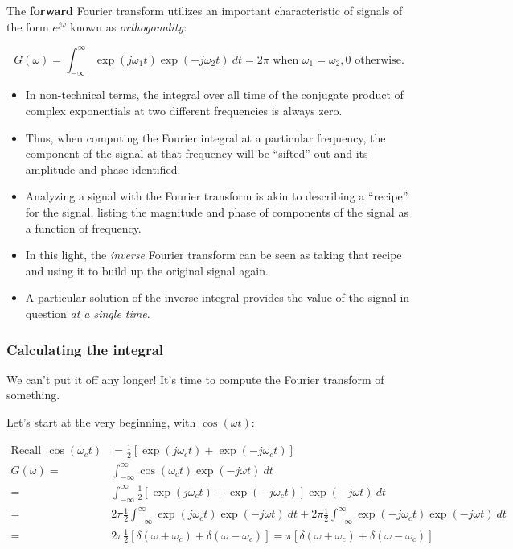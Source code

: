 \documentclass[11pt,letterpaper,draft]{exam}
\begin{document}
The \textbf{forward} Fourier transform utilizes an important
characteristic of signals of the form $e^{j\omega}$ known as \textit{orthogonality}:

\begin{equation*}
G(\omega)= \int^{\infty}_{-\infty}\exp(j\omega_1
t)\exp(-j\omega_2 t)~dt = 2\pi \text{ when }\omega_1=\omega_2, 0
\text{ otherwise}.
\end{equation*}

\begin{itemize}
\item In non-technical terms, the integral over all time of the
conjugate product of complex exponentials at two
different frequencies is always zero.

\item Thus, when computing the Fourier integral at a particular frequency,
the component of the signal at that frequency will be ``sifted'' out
and its amplitude and phase identified.

\item Analyzing a signal with the Fourier transform is akin to describing a
``recipe'' for the signal, listing the magnitude and phase of components of the signal as a
function of frequency.

\item In this light, the \textit{inverse} Fourier transform can be seen as taking
that recipe and using it to build up the original signal again. 

\item A particular solution of the inverse integral provides the value of
the signal in question \textit{at a single time}.

\end{itemize}

\subsubsection*{Calculating the integral}
We can't put it off any longer!  It's time to compute the Fourier
transform of something.  

Let's start at the very beginning, with $\cos(\omega t)$:

\begin{equation}
\begin{split}
\text{Recall}~~\cos(\omega_c t) &= \frac{1}{2}[\exp(j\omega_c t)+\exp(-j\omega_c t)]\\
G(\omega) =& \int^{\infty}_{-\infty}\cos(\omega_c t)\exp(-j\omega t)~dt\\
=& \int^{\infty}_{-\infty}\frac{1}{2}[\exp(j\omega_c t)+\exp(-j\omega_c
t)]\exp(-j\omega t)~dt\\
=& 2\pi\frac{1}{2}\int^{\infty}_{-\infty}\exp(j\omega_c t)\exp(-j\omega
t)~dt + 2\pi\frac{1}{2}\int^{\infty}_{-\infty}\exp(-j\omega_c t)\exp(-j\omega
t)~dt\\
=& 2\pi\frac{1}{2}[\delta(\omega+\omega_c)+\delta(\omega-\omega_c)] = 
 \pi[\delta(\omega+\omega_c)+\delta(\omega-\omega_c)]
\end{split}
\end{equation}
\end{document}
